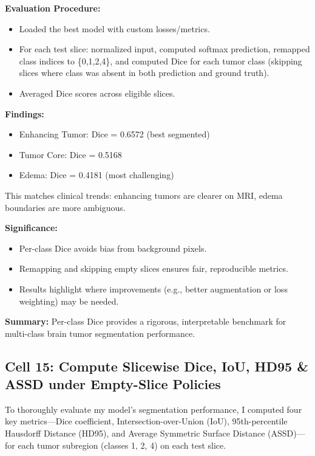 \textbf{Evaluation Procedure:}
\begin{itemize}
    \item Loaded the best model with custom losses/metrics.
    \item For each test slice: normalized input, computed softmax prediction, remapped class indices to \{0,1,2,4\}, and computed Dice for each tumor class (skipping slices where class was absent in both prediction and ground truth).
    \item Averaged Dice scores across eligible slices.
\end{itemize}

\clearpage

\textbf{Findings:}
\begin{itemize}
    \item Enhancing Tumor: Dice = 0.6572 (best segmented)
    \item Tumor Core: Dice = 0.5168
    \item Edema: Dice = 0.4181 (most challenging)
\end{itemize}
This matches clinical trends: enhancing tumors are clearer on MRI, edema boundaries are more ambiguous.

\textbf{Significance:}
\begin{itemize}
    \item Per-class Dice avoids bias from background pixels.
    \item Remapping and skipping empty slices ensures fair, reproducible metrics.
    \item Results highlight where improvements (e.g., better augmentation or loss weighting) may be needed.
\end{itemize}

\textbf{Summary:}
Per-class Dice provides a rigorous, interpretable benchmark for multi-class brain tumor segmentation performance.


\subsection{Cell 15: Compute Slicewise Dice, IoU, HD95 \& ASSD under Empty-Slice Policies}

To thoroughly evaluate my model's segmentation performance, I computed four key metrics—Dice coefficient, Intersection-over-Union (IoU), 95th-percentile Hausdorff Distance (HD95), and Average Symmetric Surface Distance (ASSD)—for each tumor subregion (classes 1, 2, 4) on each test slice.

